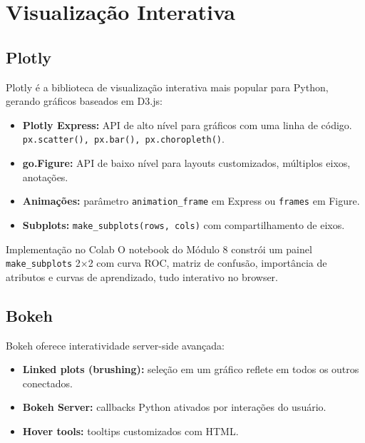 \documentclass[12pt,a4paper]{article}
\begin{document}
\section{Visualização Interativa}

\subsection{Plotly}

Plotly é a biblioteca de visualização interativa mais popular para Python, gerando gráficos baseados em D3.js:

\begin{itemize}
  \item \textbf{Plotly Express:} API de alto nível para gráficos com uma linha de código. \texttt{px.scatter(), px.bar(), px.choropleth()}.
  \item \textbf{go.Figure:} API de baixo nível para layouts customizados, múltiplos eixos, anotações.
  \item \textbf{Animações:} parâmetro \texttt{animation\_frame} em Express ou \texttt{frames} em Figure.
  \item \textbf{Subplots:} \texttt{make\_subplots(rows, cols)} com compartilhamento de eixos.
\end{itemize}

\begin{dicabox}{Implementação no Colab}
O notebook do Módulo 8 constrói um painel \texttt{make\_subplots} 2$\times$2 com curva ROC, matriz de confusão, importância de atributos e curvas de aprendizado, tudo interativo no browser.
\end{dicabox}

\subsection{Bokeh}

Bokeh oferece interatividade server-side avançada:
\begin{itemize}
  \item \textbf{Linked plots (brushing):} seleção em um gráfico reflete em todos os outros conectados.
  \item \textbf{Bokeh Server:} callbacks Python ativados por interações do usuário.
  \item \textbf{Hover tools:} tooltips customizados com HTML.
\end{itemize}
\end{document}
